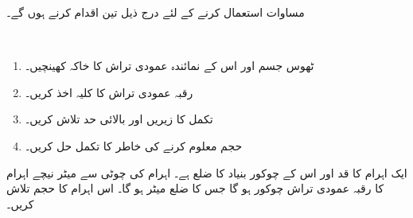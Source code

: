 مساوات  استعمال کرنے کے لئے درج ذیل تین اقدام کرنے ہوں گے۔

\\
\begin{enumerate}[1.]
\item
ٹھوس جسم  اور اس کے نمائندہ عمودی تراش کا خاکہ کھینچیں۔
\item
 رقبہ عمودی تراش  کا کلیہ اخذ کریں۔
\item
تکمل کا زیریں اور بالائی حد تلاش کریں۔
\item
حجم معلوم کرنے کی خاطر  کا تکمل حل کریں۔
\end{enumerate}

ایک اہرام کا قد  اور اس کے چوکور بنیاد کا ضلع  ہے۔ اہرام کی چوٹی سے  میٹر نیچے اہرام کا رقبہ عمودی تراش چوکور ہو گا جس کا ضلع  میٹر ہو گا۔ اس اہرام کا حجم تلاش کریں۔

